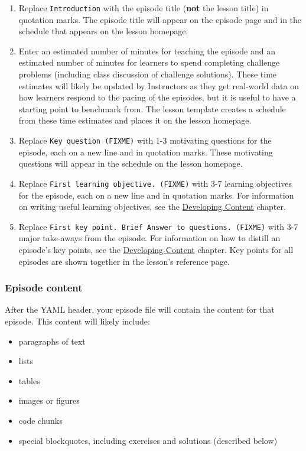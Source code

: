 \documentclass[]{book}
\providecommand{\tightlist}{%
  \setlength{\itemsep}{0pt}\setlength{\parskip}{0pt}}
\begin{document}
\begin{enumerate}
\def\labelenumi{\arabic{enumi}.}
\tightlist
\item
  Replace \texttt{Introduction} with the episode title (\textbf{not} the lesson title) in quotation marks. The episode
  title will appear on the episode page and in the schedule that appears on the lesson homepage.
\item
  Enter an estimated number of minutes for teaching the episode and an estimated number of minutes for learners to spend completing challenge problems (including class discussion of challenge solutions). These time estimates
  will likely be updated by Instructors as they get real-world data on how learners respond to the pacing of
  the episodes, but it is useful to have a starting point to benchmark from. The lesson template creates a schedule
  from these time estimates and places it on the lesson homepage.
\item
  Replace \texttt{Key\ question\ (FIXME)} with 1-3 motivating questions for the episode, each on a new line and in quotation marks. These motivating questions will appear in the schedule on the lesson homepage.
\item
  Replace \texttt{First\ learning\ objective.\ (FIXME)} with 3-7 learning objectives for the episode, each on a new line and in quotation marks. For information on writing useful learning objectives, see the \href{https://carpentries.github.io/curriculum-development/developing-content.html}{Developing Content} chapter.
\item
  Replace \texttt{First\ key\ point.\ Brief\ Answer\ to\ questions.\ (FIXME)} with 3-7 major take-aways from the episode. For
  information on how to distill an episode's key points, see the \href{https://carpentries.github.io/curriculum-development/developing-content.html}{Developing Content} chapter. Key points for all episodes are shown
  together in the lesson's reference page.
\end{enumerate}

\hypertarget{episode-content}{%
\subsubsection{Episode content}\label{episode-content}}

After the YAML header, your episode file will contain the content for that episode. This content will likely
include:

\begin{itemize}
\tightlist
\item
  paragraphs of text
\item
  lists
\item
  tables
\item
  images or figures
\item
  code chunks
\item
  special blockquotes, including exercises and solutions (described below)
\end{itemize}
\end{document}
